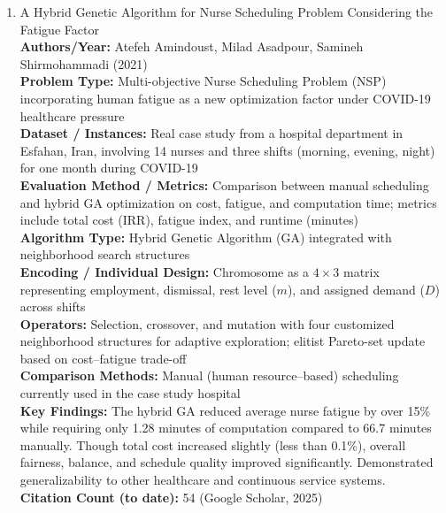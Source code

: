 \documentclass[a4paper,12pt]{article}
\begin{document}
\begin{enumerate}[leftmargin=2em, labelwidth=1em, labelsep=0.5em, itemsep=1ex]
  \item A Hybrid Genetic Algorithm for Nurse Scheduling Problem Considering the Fatigue Factor \\
    \textbf{Authors/Year:} Atefeh Amindoust, Milad Asadpour, Samineh Shirmohammadi (2021) \\  
    \textbf{Problem Type:} Multi-objective Nurse Scheduling Problem (NSP) incorporating human fatigue as a new optimization factor under COVID-19 healthcare pressure \\  
    \textbf{Dataset / Instances:} Real case study from a hospital department in Esfahan, Iran, involving 14 nurses and three shifts (morning, evening, night) for one month during COVID-19 \\  
    \textbf{Evaluation Method / Metrics:} Comparison between manual scheduling and hybrid GA optimization on cost, fatigue, and computation time; metrics include total cost (IRR), fatigue index, and runtime (minutes) \\  
    \textbf{Algorithm Type:} Hybrid Genetic Algorithm (GA) integrated with neighborhood search structures \\  
    \textbf{Encoding / Individual Design:} Chromosome as a $4\times3$ matrix representing employment, dismissal, rest level ($m$), and assigned demand ($D$) across shifts \\  
    \textbf{Operators:} Selection, crossover, and mutation with four customized neighborhood structures for adaptive exploration; elitist Pareto-set update based on cost–fatigue trade-off \\  
    \textbf{Comparison Methods:} Manual (human resource–based) scheduling currently used in the case study hospital \\  
    \textbf{Key Findings:} The hybrid GA reduced average nurse fatigue by over 15\% while requiring only 1.28 minutes of computation compared to 66.7 minutes manually. Though total cost increased slightly (less than 0.1\%), overall fairness, balance, and schedule quality improved significantly. Demonstrated generalizability to other healthcare and continuous service systems. \\  
    \textbf{Citation Count (to date):} 54 (Google Scholar, 2025) \\[2ex]


\end{enumerate}
\end{document}
